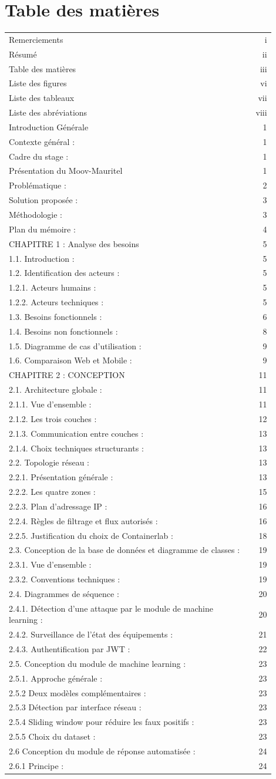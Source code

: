 \documentclass[12pt,a4paper]{report}
\newcommand{\tocrow}[2]{#1 \dotfill & #2\\}
\begin{document}
\section*{Table des matières}
\begingroup\small\setlength{\tabcolsep}{0pt}\renewcommand{\arraystretch}{1.08}
\begin{longtable}{@{}p{0.90\linewidth}@{\hspace{0.5cm}}r@{}}
\tocrow{Remerciements}{i}
\tocrow{Résumé}{ii}
\tocrow{Table des matières}{iii}
\tocrow{Liste des figures}{vi}
\tocrow{Liste des tableaux}{vii}
\tocrow{Liste des abréviations}{viii}
\tocrow{Introduction Générale}{1}
\tocrow{Contexte général :}{1}
\tocrow{Cadre du stage :}{1}
\tocrow{Présentation du Moov-Mauritel}{1}
\tocrow{Problématique :}{2}
\tocrow{Solution proposée :}{3}
\tocrow{Méthodologie :}{3}
\tocrow{Plan du mémoire :}{4}
\tocrow{CHAPITRE 1 : Analyse des besoins}{5}
\tocrow{1.1. Introduction :}{5}
\tocrow{1.2. Identification des acteurs :}{5}
\tocrow{1.2.1. Acteurs humains :}{5}
\tocrow{1.2.2. Acteurs techniques :}{5}
\tocrow{1.3. Besoins fonctionnels :}{6}
\tocrow{1.4. Besoins non fonctionnels :}{8}
\tocrow{1.5. Diagramme de cas d'utilisation :}{9}
\tocrow{1.6. Comparaison Web et Mobile :}{9}
\tocrow{CHAPITRE 2 : CONCEPTION}{11}
\tocrow{2.1. Architecture globale :}{11}
\tocrow{2.1.1. Vue d'ensemble :}{11}
\tocrow{2.1.2. Les trois couches :}{12}
\tocrow{2.1.3. Communication entre couches :}{13}
\tocrow{2.1.4. Choix techniques structurants :}{13}
\tocrow{2.2. Topologie réseau :}{13}
\tocrow{2.2.1. Présentation générale :}{13}
\tocrow{2.2.2. Les quatre zones :}{15}
\tocrow{2.2.3. Plan d'adressage IP :}{16}
\tocrow{2.2.4. Règles de filtrage et flux autorisés :}{16}
\tocrow{2.2.5. Justification du choix de Containerlab :}{18}
\tocrow{2.3. Conception de la base de données et diagramme de classes :}{19}
\tocrow{2.3.1. Vue d'ensemble :}{19}
\tocrow{2.3.2. Conventions techniques :}{19}
\tocrow{2.4. Diagrammes de séquence :}{20}
\tocrow{2.4.1. Détection d’une attaque par le module de machine learning :}{20}
\tocrow{2.4.2. Surveillance de l’état des équipements :}{21}
\tocrow{2.4.3. Authentification par JWT :}{22}
\tocrow{2.5. Conception du module de machine learning :}{23}
\tocrow{2.5.1. Approche générale :}{23}
\tocrow{2.5.2 Deux modèles complémentaires :}{23}
\tocrow{2.5.3 Détection par interface réseau :}{23}
\tocrow{2.5.4 Sliding window pour réduire les faux positifs :}{23}
\tocrow{2.5.5 Choix du dataset :}{23}
\tocrow{2.6 Conception du module de réponse automatisée :}{24}
\tocrow{2.6.1 Principe :}{24}

\end{longtable}
\end{document}
